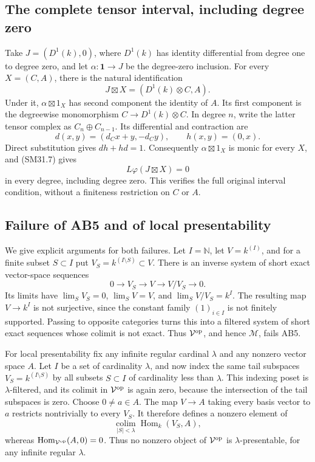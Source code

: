 \documentclass[11pt,a4paper]{article}
\theoremstyle{definition}\newtheorem{definition}[theorem]{Definition}
\theoremstyle{remark}\newtheorem{remark}[theorem]{Remark}
\begin{document}
\subsection{The complete tensor interval, including degree zero}
Take \(J=(D^1(k),0)\), where \(D^1(k)\) has identity
differential from degree one to degree zero, and let
\(\alpha:\mathbf1\to J\) be the degree-zero inclusion.
For every \(X=(C,A)\), there is the natural identification
\[
                 J\boxtimes X=(D^1(k)\otimes C,A).          \tag{SM31.8}
\]
Under it, \(\alpha\boxtimes1_X\) has second component the
identity of \(A\).  Its first component is the degreewise
monomorphism \(C\to D^1(k)\otimes C\).
In degree \(n\), write the latter tensor complex as
\(C_n\oplus C_{n-1}\).  Its differential and contraction are
\[
 d(x,y)=(d_Cx+y,-d_Cy),\qquad h(x,y)=(0,x).
\]
Direct substitution gives \(dh+hd=1\).
Consequently \(\alpha\boxtimes1_X\) is monic for every
\(X\), and (SM31.7) gives
\[
                    L\varphi(J\boxtimes X)=0
\]
in every degree, including degree zero.  This verifies the
full original interval condition, without a finiteness
restriction on \(C\) or \(A\).

\subsection{Failure of AB5 and of local presentability}
We give explicit arguments for both failures.
Let \(I=\mathbb N\), let \(V=k^{(I)}\), and for a finite
subset \(S\subset I\) put
\(V_S=k^{(I\setminus S)}\subset V\).
There is an inverse system of short exact vector-space
sequences
\[
          0\longrightarrow V_S\longrightarrow V
                  \longrightarrow V/V_S\longrightarrow0.
\]
Its limits have
\(\lim_S V_S=0\), \(\lim_S V=V\), and
\(\lim_S V/V_S=k^I\).
The resulting map \(V\to k^I\) is not surjective, since
the constant family \((1)_{i\in I}\) is not finitely supported.
Passing to opposite categories turns this into a filtered
system of short exact sequences whose colimit is not exact.
Thus \(\mathcal V^{\rm op}\), and hence \(\mathcal M\),
fails AB5.

For local presentability fix any infinite regular cardinal
\(\lambda\) and any nonzero vector space \(A\).
Let \(I\) be a set of cardinality \(\lambda\), and now
index the same tail subspaces \(V_S=k^{(I\setminus S)}\)
by all subsets \(S\subset I\) of cardinality less than
\(\lambda\).  This indexing poset is \(\lambda\)-filtered,
and its colimit in \(\mathcal V^{\rm op}\) is again zero,
because the intersection of the tail subspaces is zero.
Choose \(0\ne a\in A\).  The map \(V\to A\) taking every
basis vector to \(a\) restricts nontrivially to every \(V_S\).
It therefore defines a nonzero element of
\[
 \operatorname*{colim}_{|S|<\lambda}
          \operatorname{Hom}_k(V_S,A),
\]
whereas \(\operatorname{Hom}_{\mathcal V^{\rm op}}(A,0)=0\).
Thus no nonzero object of \(\mathcal V^{\rm op}\) is
\(\lambda\)-presentable, for any infinite regular \(\lambda\).
\end{document}
